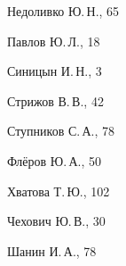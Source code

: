 \begin{theindex}
  \item Недоливко Ю.\,Н., 65





  \indexspace





  \item Павлов Ю.\,Л., 18





  \indexspace





  \item Синицын И.\,Н., 3


  \item Стрижов В.\,В., 42


  \item Ступников С.\,А., 78





  \indexspace





  \item Флёров Ю.\,А., 50





  \indexspace





  \item Хватова Т.\,Ю., 102





  \indexspace





  \item Чехович Ю.\,В., 30





  \indexspace





  \item Шанин И.\,А., 78





\end{theindex}


